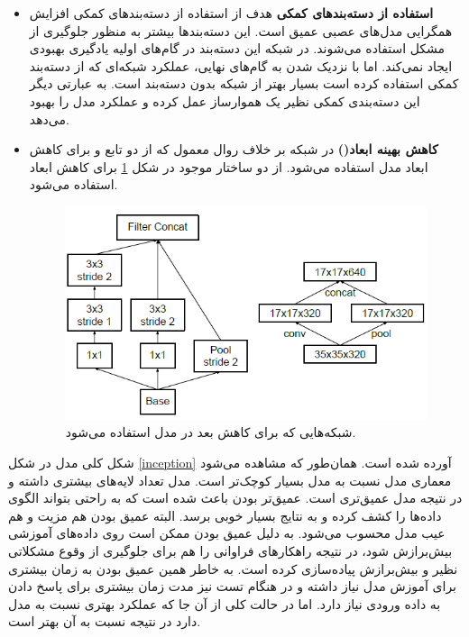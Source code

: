\documentclass[12pt, a4paper]{article}
\begin{document}
\begin{itemize}
    \item \textbf{استفاده از دسته‌بند‌های کمکی} هدف از استفاده از دسته‌بندهای کمکی افزایش همگرایی مدل‌های
    عصبی عمیق است. این دسته‌بندها بیشتر به منظور جلوگیری از مشکل  استفاده می‌شوند.
    در شبکه  این دسته‌بند در گام‌های اولیه یادگیری بهبودی ایجاد نمی‌کند. اما با نزدیک شدن به گام‌های
    نهایی، عملکرد شبکه‌ای که از دسته‌بند کمکی استفاده کرده است بسیار بهتر از شبکه بدون دسته‌بند است.
    به عبارتی دیگر این دسته‌بندی کمکی نظیر یک هموارساز عمل کرده و عملکرد مدل را بهبود می‌دهد.

    \item \textbf{کاهش بهینه ابعاد()} در شبکه  بر خلاف
    روال معمول که از دو تابع  و  برای کاهش ابعاد مدل استفاده می‌شود.
    از دو ساختار موجود در شکل \ref{reducer} برای کاهش ابعاد استفاده می‌شود.

    \begin{figure}[h]
        \centering
        \includegraphics[width=0.7\linewidth]{images/inception/reducer2.png}
        \caption{شبکه‌هایی که برای کاهش بعد در مدل  استفاده می‌شود.}
        \label{reducer}
    \end{figure}

\end{itemize}

شکل کلی مدل  در شکل \ref{inception} آورده شده است. همان‌طور که مشاهده می‌شود معماری مدل
 نسبت به مدل  بسیار کوچک‌تر است. مدل  تعداد لایه‌های بیشتری داشته
و در نتیجه مدل عمیق‌تری است. عمیق‌تر بودن باعث شده است که به راحتی بتواند الگوی داده‌ها را کشف کرده و
به نتایج بسیار خوبی برسد. البته عمیق بودن هم مزیت و هم عیب مدل محسوب می‌شود. به دلیل عمیق بودن ممکن است
روی داده‌های آموزشی بیش‌برازش شود، در نتیجه راهکار‌های فراوانی را هم برای جلوگیری از وقوع مشکلاتی نظیر
 و بیش‌برازش پیاده‌سازی کرده است. به خاطر همین عمیق بودن به زمان بیشتری برای آموزش
مدل نیاز داشته و در هنگام تست نیز مدت زمان بیشتری برای پاسخ دادن به داده ورودی نیاز دارد. اما در حالت
کلی از آن جا که عملکرد بهتری نسبت به مدل  دارد در نتیجه نسبت به آن بهتر است.
\end{document}
